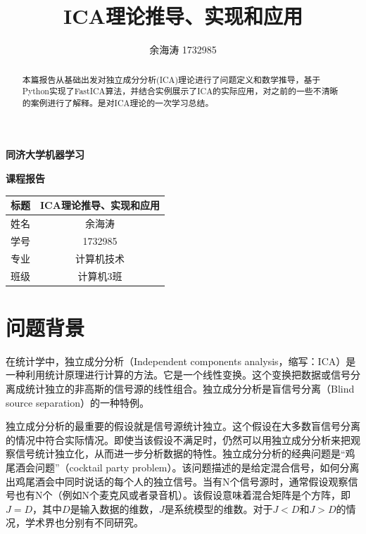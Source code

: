 \documentclass[UTF8,zihao=5,a4paper]{ctexart}
\title{ICA理论推导、实现和应用}
\author{余海涛 1732985}
\date{}
\begin{document}
    
\begin{titlepage}
    \vspace*{6cm}
    \Huge
    \begin{center}
        \textbf{同济大学机器学习}
        
        \textbf{课程报告}
    \end{center}
    \vspace{3cm}
    \begin{table}[h]
        \Large
        \centering
        \begin{tabular}{|l|c|}
        \hline
        标题 & ICA理论推导、实现和应用\\
        \hline
        姓名 & 余海涛 \\
        \hline
        学号 & 1732985\\        
        \hline
        专业 & 计算机技术\\
        \hline
        班级 & 计算机3班\\
        \hline
        \end{tabular}
    \end{table}
\end{titlepage}

\maketitle

\begin{abstract}
    本篇报告从基础出发对独立成分分析(ICA)理论进行了问题定义和数学推导，基于Python实现了FastICA算法，并结合实例展示了ICA的实际应用，对之前的一些不清晰的案例进行了解释。是对ICA理论的一次学习总结。
\end{abstract}


\section{问题背景}
在统计学中，独立成分分析\cite{icawikipedia,ica,icachinese}（Independent components analysis，缩写：ICA）是一种利用统计原理进行计算的方法。它是一个线性变换。这个变换把数据或信号分离成统计独立的非高斯的信号源的线性组合。独立成分分析是盲信号分离（Blind source separation）的一种特例。

独立成分分析的最重要的假设就是信号源统计独立。这个假设在大多数盲信号分离的情况中符合实际情况。即使当该假设不满足时，仍然可以用独立成分分析来把观察信号统计独立化，从而进一步分析数据的特性。独立成分分析的经典问题是“鸡尾酒会问题”（cocktail party problem）。该问题描述的是给定混合信号，如何分离出鸡尾酒会中同时说话的每个人的独立信号。当有N个信号源时，通常假设观察信号也有N个（例如N个麦克风或者录音机）。该假设意味着混合矩阵是个方阵，即$J = D$，其中$D$是输入数据的维数，$J$是系统模型的维数。对于$J < D$和$J > D$的情况，学术界也分别有不同研究。
\end{document}
